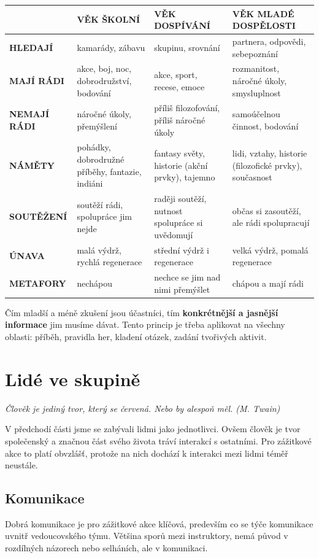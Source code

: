 \documentclass[a4paper,12pt,final]{report}
\begin{document}
\begin{center}
\renewcommand{\arraystretch}{1.5}
\begin{tabular}{ | m{2cm} || m{4.2cm}| m{4.2cm} | m{4.2cm} | } 
  \hline
  & \vspace{.3cm} \textbf{VĚK ŠKOLNÍ} & \vspace{.3cm} \textbf{VĚK DOSPÍVÁNÍ} & \vspace{.3cm} \textbf{VĚK MLADÉ DOSPĚLOSTI}\tabularnewline [12pt]
  \hline
  \textbf{HLEDAJÍ} & kamarády, zábavu & skupinu, srovnání & partnera, odpovědi, sebepoznání\tabularnewline
  \hline
  \textbf{MAJÍ RÁDI} & akce, boj, noc, dobrodružství, bodování & akce, sport, recese, emoce & rozmanitost, náročné úkoly, smysluplnost \tabularnewline
  \hline
  \textbf{NEMAJÍ RÁDI} & náročné úkoly, přemýšlení & příliš filozofování, příliš náročné úkoly & samoúčelnou činnost, bodování \tabularnewline
  \hline
  \textbf{NÁMĚTY} & pohádky, dobrodružné příběhy, fantazie, indiáni & fantasy světy, historie (akční prvky), tajemno & lidi, vztahy, historie (filozofické prvky), současnost \tabularnewline
  \hline
  \textbf{SOUTĚŽENÍ} & soutěží rádi, spolupráce jim nejde & raději soutěží, nutnost spolupráce si uvědomují & občas si zasoutěží, ale rádi spolupracují \tabularnewline
  \hline
  \textbf{ÚNAVA} & malá výdrž, rychlá regenerace & střední výdrž i regenerace & velká výdrž, pomalá regenerace \tabularnewline
  \hline
  \textbf{METAFORY} & nechápou & nechce se jim nad nimi přemýšlet & chápou a mají rádi \tabularnewline
  \hline
\end{tabular}
\end{center}
\pagelogos

Čím mladší a méně zkušení jsou účastníci, tím \textbf{konkrétnější a jasnější informace} jim musíme dávat. Tento princip je třeba aplikovat na všechny oblasti: příběh, pravidla her, kladení otázek, zadání tvořivých aktivit.


\section[Lidé ve skupině]{Lidé ve skupině}
\pagelogos
\textit{Člověk je jediný tvor, který se červená. Nebo by alespoň měl. (M. Twain)}

V předchodí části jsme se zabývali lidmi jako jednotlivci. Ovšem člověk je tvor společenský a značnou část svého života tráví interakcí s ostatními. Pro zážitkové akce to platí obvzlášť, protože na nich dochází k interakci mezi lidmi téměř neustále.

\subsection*{Komunikace}
Dobrá komunikace je pro zážitkové akce klíčová, predevším co se týče komunikace uvnitř vedoucovského týmu. Většina sporů mezi instruktory, nemá původ v rozdílných názorech nebo selháních, ale v komunikaci.
\end{document}
